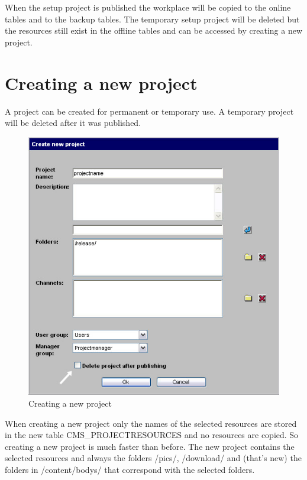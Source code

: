 When the setup project is published the workplace will be copied
to the online tables and to the backup tables. The temporary setup
project will be deleted but the resources still exist in the
offline tables and can be accessed by creating a new project.

\section{Creating a new project}

A project can be created for permanent or temporary use. A
temporary project will be deleted after it was published.

\begin{figure}[hbt]
\begin{center}
\includegraphics[width=\sgw]
                   {pics/newProject/newPro01}
\caption[Creating a new project]
           {Creating a new project}
\label{newproject}
\end{center}
\end{figure}

When creating a new project only the names of the selected
resources are stored in the new table CMS\_PROJECTRESOURCES and no
resources are copied. So creating a new project is much faster
than before. The new project contains the selected resources and
always the folders /pics/, /download/ and (that's new) the folders
in /content/bodys/ that correspond with the selected folders.


